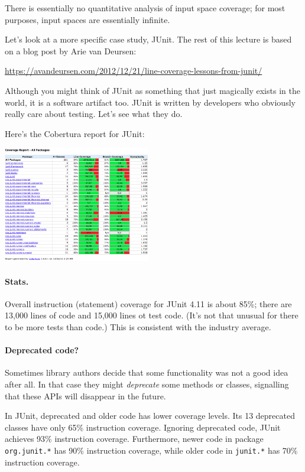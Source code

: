 \documentclass[11pt]{article}
\begin{document}
There is essentially no quantitative analysis of input space coverage;
for most purposes, input spaces are essentially infinite.

Let's look at a more specific case study, JUnit. The rest of this lecture is
based on a blog post by Arie van Deursen:

\begin{center}
  \url{https://avandeursen.com/2012/12/21/line-coverage-lessons-from-junit/}
\end{center}

Although you might think of JUnit as something that just magically exists in the world,
it is a software artifact too. JUnit is written by developers who obviously really care
about testing. Let's see what they do.

Here's the Cobertura report for JUnit:

\begin{center}
  \includegraphics[height=2in]{L03/cobertura-junit.png}
\end{center}

\paragraph{Stats.} Overall instruction (statement) coverage for JUnit 4.11 is about 85\%; there are
13,000 lines of code and 15,000 lines ot test code. (It's not that
unusual for there to be more tests than code.) This is consistent with
the industry average.

\paragraph{Deprecated code?} Sometimes library authors decide that some functionality
was not a good idea after all. In that case they might \emph{deprecate} some methods or
classes, signalling that these APIs will disappear in the future.

In JUnit, deprecated and older code has lower coverage levels. Its 13 deprecated
classes have only 65\% instruction coverage. Ignoring deprecated code, JUnit achieves
93\% instruction coverage. Furthermore, newer code in
package {\tt org.junit.*} has 90\% instruction coverage, while older code in
{\tt junit.*} has 70\% instruction coverage.
\end{document}
